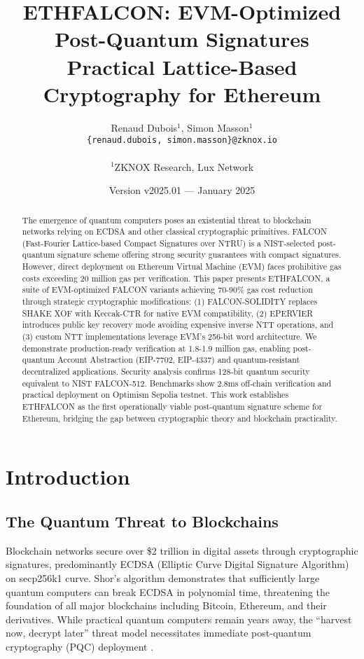 \documentclass[11pt,a4paper]{article}
\title{\textbf{ETHFALCON: EVM-Optimized Post-Quantum Signatures}\\
\large{Practical Lattice-Based Cryptography for Ethereum}}
\author{
Renaud Dubois$^{1}$, Simon Masson$^{1}$ \\
\texttt{\{renaud.dubois, simon.masson\}@zknox.io} \\
\\
$^{1}$ZKNOX Research, Lux Network
}
\date{Version v2025.01 --- January 2025}
\begin{document}
\maketitle

\begin{abstract}
The emergence of quantum computers poses an existential threat to blockchain networks relying on ECDSA and other classical cryptographic primitives. FALCON (Fast-Fourier Lattice-based Compact Signatures over NTRU) is a NIST-selected post-quantum signature scheme offering strong security guarantees with compact signatures. However, direct deployment on Ethereum Virtual Machine (EVM) faces prohibitive gas costs exceeding 20 million gas per verification. This paper presents ETHFALCON, a suite of EVM-optimized FALCON variants achieving 70-90\% gas cost reduction through strategic cryptographic modifications: (1) FALCON-SOLIDITY replaces SHAKE XOF with Keccak-CTR for native EVM compatibility, (2) EPERVIER introduces public key recovery mode avoiding expensive inverse NTT operations, and (3) custom NTT implementations leverage EVM's 256-bit word architecture. We demonstrate production-ready verification at 1.8-1.9 million gas, enabling post-quantum Account Abstraction (EIP-7702, EIP-4337) and quantum-resistant decentralized applications. Security analysis confirms 128-bit quantum security equivalent to NIST FALCON-512. Benchmarks show 2.8ms off-chain verification and practical deployment on Optimism Sepolia testnet. This work establishes ETHFALCON as the first operationally viable post-quantum signature scheme for Ethereum, bridging the gap between cryptographic theory and blockchain practicality.
\end{abstract}

\section{Introduction}

\subsection{The Quantum Threat to Blockchains}

Blockchain networks secure over \$2 trillion in digital assets through cryptographic signatures, predominantly ECDSA (Elliptic Curve Digital Signature Algorithm) on secp256k1 curve. Shor's algorithm \cite{shor1997polynomial} demonstrates that sufficiently large quantum computers can break ECDSA in polynomial time, threatening the foundation of all major blockchains including Bitcoin, Ethereum, and their derivatives. While practical quantum computers remain years away, the ``harvest now, decrypt later'' threat model necessitates immediate post-quantum cryptography (PQC) deployment \cite{mosca2018cybersecurity}.
\end{document}
